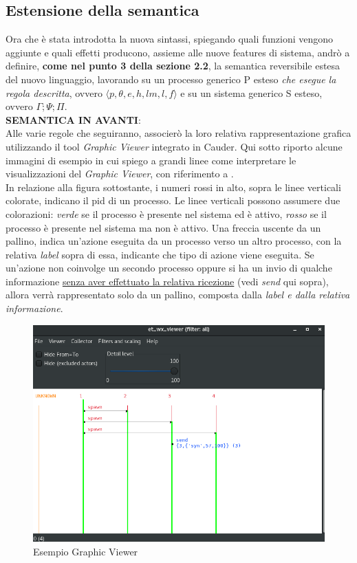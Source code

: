 \documentclass[Contributo.tex]{subfiles}
\begin{document}
\subsection{Estensione della semantica}
Ora che è stata introdotta la nuova sintassi, spiegando quali funzioni vengono aggiunte e quali effetti producono, assieme alle nuove features di sistema, andrò a definire, \textbf{come nel punto 3 della sezione 2.2}, la semantica reversibile estesa del nuovo linguaggio, lavorando su un processo generico P esteso \textit{che esegue la regola descritta}, ovvero $\displaystyle \langle p,\theta,e,h,lm,l,f \rangle$ e su un sistema generico S esteso, ovvero $\displaystyle \Gamma;\Psi;\Pi$.\\
\textbf{SEMANTICA IN AVANTI}:\\
	Alle varie regole che seguiranno, associerò la loro relativa rappresentazione grafica utilizzando il tool \textit{Graphic Viewer} integrato in Cauder. Qui sotto riporto alcune immagini di esempio in cui spiego a grandi linee come interpretare le visualizzazioni del \textit{Graphic Viewer}, con riferimento a \cite{et}.\\
	In relazione alla figura sottostante, i numeri rossi in alto, sopra le linee verticali colorate, indicano il pid di un processo. Le linee verticali possono assumere due colorazioni: \textit{verde} se il processo è presente nel sistema ed è attivo, \textit{rosso} se il processo è presente nel sistema ma non è attivo. Una freccia uscente da un pallino, indica un'azione eseguita da un processo verso un altro processo, con la relativa \textit{label} sopra di essa, indicante che tipo di azione viene eseguita. Se un'azione non coinvolge un secondo processo oppure si ha un invio di qualche informazione \underline{senza aver effettuato la relativa ricezione} (vedi \textit{send} qui sopra), allora verrà rappresentato solo da un pallino, composta dalla \textit{label e dalla relativa informazione}.
	\begin{figure}[H]
		\includegraphics[scale=0.5]{./LavoroLuca/EstensioneCauder/Imgs/GraphicViewerSend}
		\caption{Esempio Graphic Viewer}
		\label{fig5}
	\end{figure}
\end{document}
